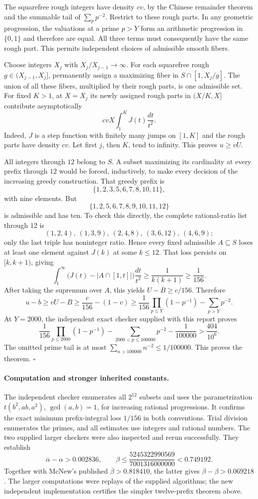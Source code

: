 The squarefree rough integers have density $cv$, by the Chinese remainder
theorem and the summable tail of $\sum_p p^{-2}$. Restrict to these rough parts.
In any geometric progression, the valuations at a prime $p>Y$ form an
arithmetic progression in $\{0,1\}$ and therefore are equal. All three terms
must consequently have the same rough part. This permits independent choices
of admissible smooth fibers.

Choose integers $X_j$ with $X_j/X_{j-1}\to\infty$. For each squarefree rough
$g\in(X_{j-1},X_j]$, permanently assign a maximizing fiber in
$S\cap[1,X_j/g]$. The union of all these fibers, multiplied by their rough
parts, is one admissible set. For fixed $K>1$, at $X=X_j$ its newly assigned
rough parts in $(X/K,X]$ contribute asymptotically
\[
 cvX\int_1^K J(t)\frac{dt}{t^2}.
\]
Indeed, $J$ is a step function with finitely many jumps on $[1,K]$ and the
rough parts have density $cv$. Let first $j$, then $K$, tend to infinity.
This proves $u\ge vU$.

All integers through $12$ belong to $S$. A subset maximizing its cardinality
at every prefix through $12$ would be forced, inductively, to make every
decision of the increasing greedy construction. That greedy prefix is
\[
             \{1,2,3,5,6,7,8,10,11\},
\]
with nine elements. But
\[
             \{1,2,5,6,7,8,9,10,11,12\}
\]
is admissible and has ten. To check this directly, the complete rational-ratio
list through $12$ is
\[
 (1,2,4),\ (1,3,9),\ (2,4,8),\ (3,6,12),\ (4,6,9);
\]
only the last triple has noninteger ratio. Hence every fixed admissible
$A\subseteq S$ loses at least one element against $J(k)$ at some $k\le12$.
That loss persists on $[k,k+1)$, giving
\[
 \int_1^\infty\bigl(J(t)-|A\cap[1,t]|\bigr)\frac{dt}{t^2}
 \ge\frac1{k(k+1)}\ge\frac1{156}.
\]
After taking the supremum over $A$, this yields $U-B\ge c/156$. Therefore
\[
 u-b\ge vU-B
 \ge \frac c{156}-(1-v)
 \ge \frac1{156}\prod_{p\le Y}(1-p^{-1})-\sum_{p>Y}p^{-2}.
\]
At $Y=2000$, the independent exact checker supplied with this report proves
\[
 \frac1{156}\prod_{p\le2000}(1-p^{-1})
 -\sum_{2000<p\le100000}p^{-2}-\frac1{100000}
 >\frac{404}{10^6}.
\]
The omitted prime tail is at most
$\sum_{n>100000}n^{-2}\le1/100000$. This proves the theorem.
\hfill$\square$

\paragraph{Computation and stronger inherited constants.}
The independent checker enumerates all $2^{12}$ subsets and uses the
parametrization $t(b^2,ab,a^2)$, $\gcd(a,b)=1$, for increasing rational
progressions. It confirms the exact minimum prefix-integral loss $1/156$ in
both conventions. Trial division enumerates the primes, and all estimates
use integers and rational numbers.
The two supplied larger checkers were also inspected and rerun successfully.
They establish
\[
 \overline\alpha-\alpha>0.002836,
 \qquad
 \beta\le\frac{5245322990569}{7001316000000}<0.749192.
\]
Together with McNew's published $\overline\beta>0.818410$, the latter gives
$\overline\beta-\beta>0.069218$. The larger computations were replays of the
supplied algorithms; the new independent implementation certifies the simpler
twelve-prefix theorem above.

